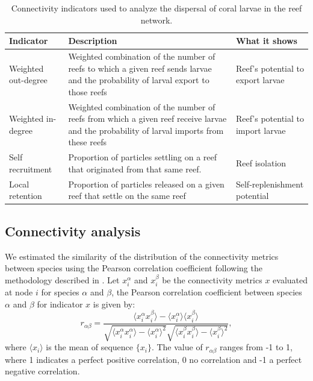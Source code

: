 \documentclass[fleqn,10pt]{wlscirep}
\newcommand{\mean}[1]{\langle {#1} \rangle}
\begin{document}
\begin{table}
    \centering
    \begin{tabular}{p{}p{}p{}}
        \hline
        \textbf{Indicator} & \textbf{Description} & \textbf{What it shows} \\
        \hline
        Weighted out-degree & Weighted combination of the number of reefs to which a given reef sends larvae and the probability of larval export to those reefs & Reef's potential to export larvae \\
        Weighted in-degree & Weighted combination of the number of reefs from which a given reef receive larvae and the probability of larval imports from these reefs & Reef's potential to import larvae \\
        Self recruitment & Proportion of particles settling on a reef that originated from that same reef. & Reef isolation \\
        Local retention & Proportion of particles released on a given reef that settle on the same reef & Self-replenishment potential \\
        \hline
    \end{tabular}
    \caption{Connectivity indicators used to analyze the dispersal of coral larvae in the reef network.}\label{tab:indicators}
\end{table}

\subsection*{Connectivity analysis}

We estimated the similarity of the distribution of the connectivity metrics between species using the Pearson correlation coefficient following the methodology described in \citep{boccaletti2014structure}. Let $x_i^\alpha$ and $x^\beta_i$ be the connectivity metrics $x$ evaluated at node $i$ for species $\alpha$ and $\beta$, the Pearson correlation coefficient between species $\alpha$ and $\beta$ for indicator $x$ is given by:
\begin{equation}
    r_{\alpha\beta} =  \dfrac{\mean{x_i^{\alpha}x_i^{\beta}} - \mean{x_i^\alpha}\mean{x_i^\beta}}{\sqrt{\mean{x_i^\alpha x_i^\alpha} - \mean{x_i^\alpha}^2}\sqrt{\mean{x_i^\beta x_i^\beta} - \mean{x_i^\beta}^2}},
\end{equation} 
where $\mean{x_i}$ is the mean of sequence $\{x_i\}$. The value of $r_{\alpha\beta}$ ranges from -1 to 1, where 1 indicates a perfect positive correlation, 0 no correlation and -1 a perfect negative correlation.
\end{document}

